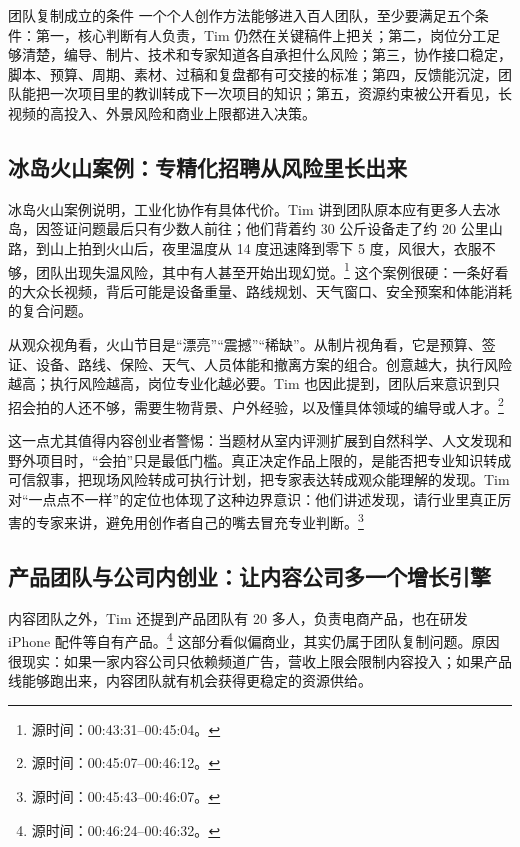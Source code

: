 \documentclass[a4paper]{article}
\begin{document}
\begin{importantbox}{团队复制成立的条件}
一个个人创作方法能够进入百人团队，至少要满足五个条件：第一，核心判断有人负责，Tim 仍然在关键稿件上把关；第二，岗位分工足够清楚，编导、制片、技术和专家知道各自承担什么风险；第三，协作接口稳定，脚本、预算、周期、素材、过稿和复盘都有可交接的标准；第四，反馈能沉淀，团队能把一次项目里的教训转成下一次项目的知识；第五，资源约束被公开看见，长视频的高投入、外景风险和商业上限都进入决策。
\end{importantbox}

\subsection{冰岛火山案例：专精化招聘从风险里长出来}

冰岛火山案例说明，工业化协作有具体代价。Tim 讲到团队原本应有更多人去冰岛，因签证问题最后只有少数人前往；他们背着约 30 公斤设备走了约 20 公里山路，到山上拍到火山后，夜里温度从 14 度迅速降到零下 5 度，风很大，衣服不够，团队出现失温风险，其中有人甚至开始出现幻觉。\footnote{源时间：00:43:31--00:45:04。} 这个案例很硬：一条好看的大众长视频，背后可能是设备重量、路线规划、天气窗口、安全预案和体能消耗的复合问题。

从观众视角看，火山节目是“漂亮”“震撼”“稀缺”。从制片视角看，它是预算、签证、设备、路线、保险、天气、人员体能和撤离方案的组合。创意越大，执行风险越高；执行风险越高，岗位专业化越必要。Tim 也因此提到，团队后来意识到只招会拍的人还不够，需要生物背景、户外经验，以及懂具体领域的编导或人才。\footnote{源时间：00:45:07--00:46:12。}

这一点尤其值得内容创业者警惕：当题材从室内评测扩展到自然科学、人文发现和野外项目时，“会拍”只是最低门槛。真正决定作品上限的，是能否把专业知识转成可信叙事，把现场风险转成可执行计划，把专家表达转成观众能理解的发现。Tim 对“一点点不一样”的定位也体现了这种边界意识：他们讲述发现，请行业里真正厉害的专家来讲，避免用创作者自己的嘴去冒充专业判断。\footnote{源时间：00:45:43--00:46:07。}

\subsection{产品团队与公司内创业：让内容公司多一个增长引擎}

内容团队之外，Tim 还提到产品团队有 20 多人，负责电商产品，也在研发 iPhone 配件等自有产品。\footnote{源时间：00:46:24--00:46:32。} 这部分看似偏商业，其实仍属于团队复制问题。原因很现实：如果一家内容公司只依赖频道广告，营收上限会限制内容投入；如果产品线能够跑出来，内容团队就有机会获得更稳定的资源供给。
\end{document}
